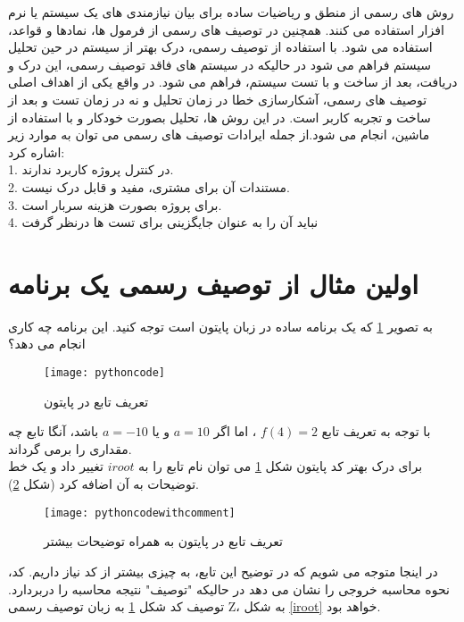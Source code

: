 روش های رسمی از منطق و ریاضیات ساده برای بیان نیازمندی های یک سیستم یا نرم افزار استفاده می کنند. همچنین در توصیف های رسمی از فرمول ها، نمادها و قواعد، استفاده می شود. با استفاده از توصیف رسمی، درک بهتر از سیستم در حین تحلیل سیستم فراهم می شود در حالیکه در سیستم های فاقد توصیف رسمی، این درک و دریافت، بعد از ساخت و با تست سیستم، فراهم می شود. در واقع یکی از اهداف اصلی توصیف های رسمی، آشکارسازی خطا در زمان تحلیل و نه در زمان تست و بعد از ساخت و تجربه کاربر است. در این روش ها، تحلیل بصورت خودکار و با استفاده از ماشین، انجام می شود.از جمله ایرادات توصیف های رسمی می توان به موارد زیر اشاره کرد:
\\
1. در کنترل پروژه کاربرد ندارند.
\\
2. مستندات آن برای مشتری، مفید و قابل درک نیست.
\\
3. برای پروژه بصورت هزینه سربار است.
\\
4. نباید آن را به عنوان جایگزینی برای تست ها درنظر گرفت

\section{اولین مثال از توصیف رسمی یک برنامه}
به تصویر \ref{pythoncode} که یک برنامه ساده در زبان پایتون است توجه کنید. این برنامه چه کاری انجام می دهد؟

\begin{figure}[!t]
\centering\texttt{[image: pythoncode]}
\caption{
تعریف تابع در پایتون
}\label{pythoncode}
\end{figure}

با توجه به تعریف تابع 
$f(4)=2$
، اما اگر 
$a=10$
و یا
 $a=-10$
 باشد، آنگا تابع چه مقداری را برمی گرداند.
 \\
 برای درک بهتر کد پایتون شکل \ref{pythoncode} می توان نام تابع را به
  $ iroot $
تغییر داد و یک خط توضیحات به آن اضافه کرد (شکل \ref{pythoncodewithcomment}).

\begin{figure}[!t]
\centering\texttt{[image: pythoncodewithcomment]}
\caption{
تعریف تابع در پایتون به همراه توضیحات بیشتر
}\label{pythoncodewithcomment}
\end{figure}


 در اینجا متوجه می شویم که در توضیح این تابع، به چیزی بیشتر از کد نیاز داریم. کد، نحوه محاسبه خروجی را نشان می دهد در حالیکه "توصیف" نتیجه محاسبه را دربردارد. توصیف کد شکل
 \ref{pythoncode}
به زبان توصیف رسمی Z، به شکل \ref{iroot} خواهد بود.

